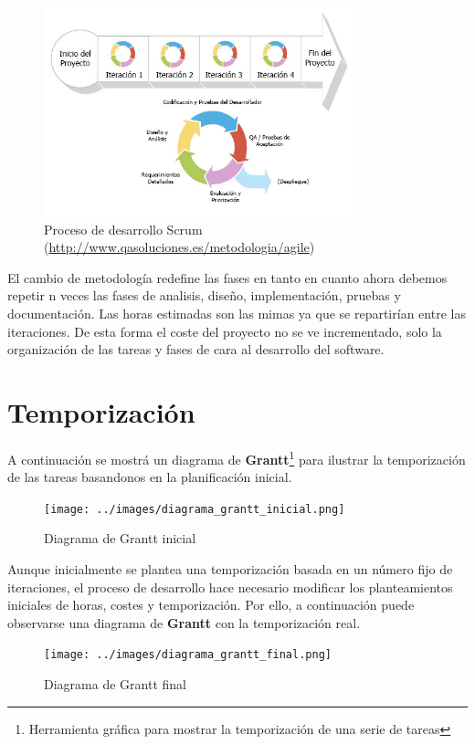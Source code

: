 \begin{figure}[!ht]
  \begin{center}
  \includegraphics[width=0.8\textwidth]{../images/scrum-iteration-detail-es.png}
  \caption{Proceso de desarrollo Scrum (\url{http://www.qasoluciones.es/metodologia/agile})}
  \label{fig:diag_scrum}
  \end{center}
\end{figure}

El cambio de metodología redefine las fases en tanto en cuanto ahora debemos repetir n veces las fases de analisis, diseño, implementación, pruebas y documentación. Las horas estimadas son las mimas ya que se repartirían entre las iteraciones. De esta forma el coste del proyecto no se ve incrementado, solo la organización de las tareas y fases de cara al desarrollo del software. 

\section{Temporización}

A continuación se mostrá un diagrama de \textbf{Grantt}\footnote{Herramienta gráfica para mostrar la temporización de una serie de tareas} para ilustrar la temporización de las tareas basandonos en la planificación inicial. 

\begin{figure}[!ht]
  \begin{center}
  \texttt{[image: ../images/diagrama\_grantt\_inicial.png]}
  \caption{Diagrama de Grantt inicial}
  \label{fig:diag_grant_inicial}
  \end{center}
\end{figure}

\bigskip
Aunque inicialmente se plantea una temporización basada en un número fijo de iteraciones, el proceso de desarrollo hace necesario modificar los planteamientos iniciales de horas, costes y temporización. Por ello, a continuación puede observarse una diagrama de \textbf{Grantt} con la temporización real.

\begin{figure}[!ht]
  \begin{center}
  \texttt{[image: ../images/diagrama\_grantt\_final.png]}
  \caption{Diagrama de Grantt final}
  \label{fig:diag_grant_final}
  \end{center}
\end{figure}
